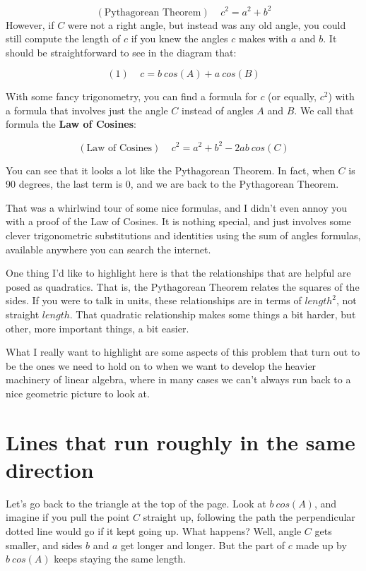 \documentclass[
]{book}
\begin{document}
\[(\text{Pythagorean Theorem}) \ \ \ \ \ c^2 = a^2 + b^2\]
However, if \(C\) were not a right angle, but instead was any old angle, you could still compute the length of \(c\) if you knew the angles \(c\) makes with \(a\) and \(b\). It should be straightforward to see in the diagram that:

\[(1) \ \ \ \ \ c = b \ cos(A) + a \ cos(B)\]

With some fancy trigonometry, you can find a formula for \(c\) (or equally, \(c^2\)) with a formula that involves just the angle \(C\) instead of angles \(A\) and \(B\). We call that formula the \textbf{Law of Cosines}:

\[(\text{Law of Cosines}) \ \ \ \ \ c^2 = a^2 + b^2 - 2 a b \ cos(C)\]

You can see that it looks a lot like the Pythagorean Theorem. In fact, when \(C\) is 90 degrees, the last term is \(0\), and we are back to the Pythagorean Theorem.

That was a whirlwind tour of some nice formulas, and I didn't even annoy you with a proof of the Law of Cosines. It is nothing special, and just involves some clever trigonometric substitutions and identities using the sum of angles formulas, available anywhere you can search the internet.

One thing I'd like to highlight here is that the relationships that are helpful are posed as quadratics. That is, the Pythagorean Theorem relates the squares of the sides. If you were to talk in units, these relationships are in terms of \(length^2\), not straight \(length\). That quadratic relationship makes some things a bit harder, but other, more important things, a bit easier.

What I really want to highlight are some aspects of this problem that turn out to be the ones we need to hold on to when we want to develop the heavier machinery of linear algebra, where in many cases we can't always run back to a nice geometric picture to look at.

\hypertarget{lines-that-run-roughly-in-the-same-direction}{%
\section{Lines that run roughly in the same direction}\label{lines-that-run-roughly-in-the-same-direction}}

Let's go back to the triangle at the top of the page. Look at \(b\ cos(A)\), and imagine if you pull the point \(C\) straight up, following the path the perpendicular dotted line would go if it kept going up. What happens? Well, angle \(C\) gets smaller, and sides \(b\) and \(a\) get longer and longer. But the part of \(c\) made up by \(b\ cos(A)\) keeps staying the same length.
\end{document}
